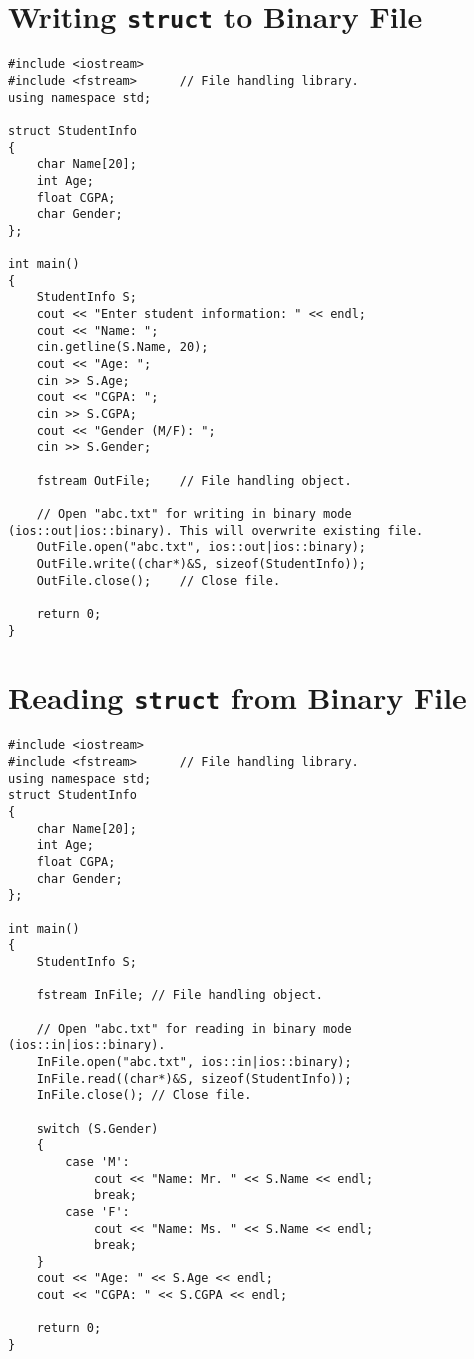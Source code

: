\documentclass[12pt,a4paper]{article}
\begin{document}
\section{Writing \texttt{struct} to Binary File}
\begin{lstlisting}[caption={Writing a \texttt{struct} to binary file}]
#include <iostream>
#include <fstream>		// File handling library.
using namespace std;

struct StudentInfo
{
	char Name[20];
	int Age;
	float CGPA;
	char Gender;
};

int main()
{
	StudentInfo S;
	cout << "Enter student information: " << endl;
	cout << "Name: ";
	cin.getline(S.Name, 20);
	cout << "Age: ";
	cin >> S.Age;
	cout << "CGPA: ";
	cin >> S.CGPA;
	cout << "Gender (M/F): ";
	cin >> S.Gender;

	fstream OutFile;	// File handling object.

	// Open "abc.txt" for writing in binary mode (ios::out|ios::binary). This will overwrite existing file.
	OutFile.open("abc.txt", ios::out|ios::binary);
	OutFile.write((char*)&S, sizeof(StudentInfo));
	OutFile.close();	// Close file.

	return 0;
}
\end{lstlisting}
\section{Reading \texttt{struct} from Binary File}
\begin{lstlisting}[caption={Reading a \texttt{struct} from Binary file}]
#include <iostream>
#include <fstream>		// File handling library.
using namespace std;
struct StudentInfo
{
	char Name[20];
	int Age;
	float CGPA;
	char Gender;
};

int main()
{
	StudentInfo S;

	fstream InFile;	// File handling object.

	// Open "abc.txt" for reading in binary mode (ios::in|ios::binary).
	InFile.open("abc.txt", ios::in|ios::binary);
	InFile.read((char*)&S, sizeof(StudentInfo));
	InFile.close();	// Close file.

	switch (S.Gender)
	{
		case 'M':
			cout << "Name: Mr. " << S.Name << endl;
			break;
		case 'F':
			cout << "Name: Ms. " << S.Name << endl;
			break;
	}
	cout << "Age: " << S.Age << endl;
	cout << "CGPA: " << S.CGPA << endl;

	return 0;
}
\end{lstlisting}
\end{document}
